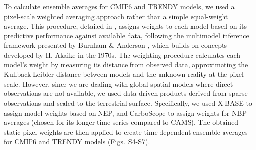 \documentclass[9pt,twocolumn,twoside]{pnas-new}
\begin{document}
{To calculate ensemble averages for CMIP6 and TRENDY models, we used a pixel-scale weighted averaging approach rather than a simple equal-weight average. This procedure, detailed in \cite{Sierra2025GMD}, assigns weights to each model based on its predictive performance against available data, following the multimodel inference framework presented by Burnham \& Anderson \cite{Burnham2002}, which builds on concepts developed by H. Akaike in the 1970s. The weighting procedure calculates each model's weight by measuring its distance from observed data, approximating the Kullback-Leibler distance between models and the unknown reality at the pixel scale. However, since we are dealing with global spatial models where direct observations are not available, we used data-driven products derived from sparse observations and scaled to the terrestrial surface. Specifically, we used X-BASE to assign model weights based on NEP, and CarboScope to assign weights for NBP averages (chosen for its longer time series compared to CAMS). The obtained static pixel weights are then applied to create time-dependent ensemble averages for CMIP6 and TRENDY models (Figs.~S4-S7).







 



}
\end{document}
